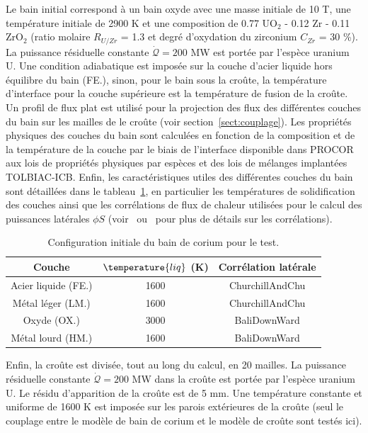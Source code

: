 Le bain initial correspond à un bain oxyde avec une masse initiale de 10 T, une température initiale de 2900 K et une composition de 0.77 UO$_2$ - 0.12 Zr - 0.11 ZrO$_2$ (ratio molaire $R_{U/Zr}$ = 1.3 et degré d'oxydation du zirconium $C_{Zr}$ = 30 \%). La puissance résiduelle constante $\dot{\mathcal{Q}} = 200$ MW est portée par l'espèce uranium U. Une condition adiabatique est imposée sur la couche d'acier liquide hors équilibre du bain (FE.), sinon, pour le bain sous la croûte, la température d'interface pour la couche supérieure est la température de fusion de la croûte. Un profil de flux plat est utilisé pour la projection des flux des différentes couches du bain sur les mailles de le croûte (voir section~\ref{sect:couplage}). Les propriétés physiques des couches du bain sont calculées en fonction de la composition et de la température de la couche par le biais de l'interface disponible dans PROCOR aux lois de propriétés physiques par espèces et des lois de mélanges implantées TOLBIAC-ICB. Enfin, les caractéristiques utiles des différentes couches du bain sont détaillées dans le tableau~\ref{tab:caracteristiques_couches_bain}, en particulier les températures de solidification des couches ainsi que les corrélations de flux de chaleur utilisées pour le calcul des puissances latérales $\phi S$ (voir~\cite{Bonnet1999} ou~\cite{Tourniaire2009a} pour plus de détails sur les corrélations).
\begin{table}
	\centering
	\begin{tabular}{ccc} 
	\hline
	Couche & $\temperature{liq}$ (K) & Corrélation latérale\\
	\hline
	Acier liquide (FE.) & 1600 & ChurchillAndChu\\
	Métal léger (LM.) & 1600 & ChurchillAndChu\\
	Oxyde (OX.) & 3000 & BaliDownWard\\
	Métal lourd (HM.) & 1600 & BaliDownWard\\
	\hline
	\end{tabular}	
	\caption{Configuration initiale du bain de corium pour le test.} 
	\label{tab:caracteristiques_couches_bain}
\end{table}

Enfin, la croûte est divisée, tout au long du calcul, en 20 mailles. La puissance résiduelle constante $\dot{\mathcal{Q}} = 200$ MW dans la croûte est portée par l'espèce uranium U. Le résidu d'apparition de la croûte est de 5 mm. Une température constante et uniforme de 1600 K est imposée sur les parois extérieures de la croûte (seul le couplage entre le modèle de bain de corium et le modèle de croûte sont testés ici).

